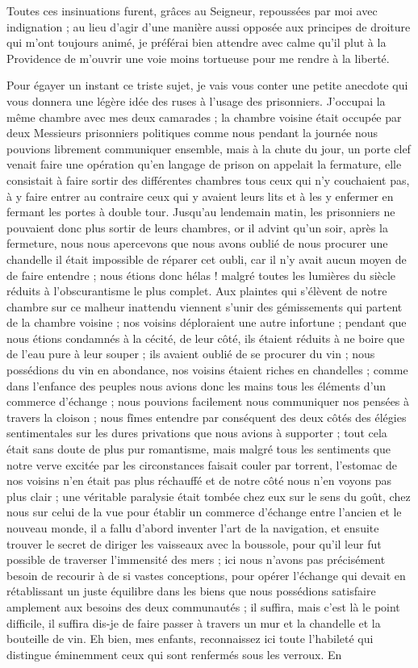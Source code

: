 \documentclass[11pt,a4paper]{report}
\begin{document}
Toutes ces insinuations furent, grâces au Seigneur, repoussées par moi avec indignation ; au lieu d'agir d'une manière aussi opposée aux principes de droiture qui m'ont toujours animé, je préférai bien attendre avec calme qu'il plut à la Providence de m'ouvrir une voie moins tortueuse pour me rendre à la liberté.

Pour égayer un instant ce triste sujet, je vais vous conter une petite anecdote qui vous donnera une légère idée des ruses à l'usage des prisonniers. J'occupai la même chambre avec mes deux camarades ; la chambre voisine était occupée par deux Messieurs prisonniers politiques comme nous pendant la journée nous pouvions librement communiquer ensemble, mais à la chute du jour, un porte clef venait faire une opération qu'en langage de prison on appelait la fermature, elle consistait à faire sortir des différentes chambres tous ceux qui n'y couchaient pas, à y faire entrer au contraire ceux qui y avaient leurs lits et à les y enfermer en fermant les portes à double tour. Jusqu'au lendemain matin, les prisonniers ne pouvaient donc plus sortir de leurs chambres, or il advint qu'un soir, après la fermeture, nous nous apercevons que nous avons oublié de nous procurer une chandelle il était impossible de réparer cet oubli, car il n'y avait aucun moyen de de faire entendre ; nous étions donc hélas ! malgré toutes les lumières du siècle réduits à l'obscurantisme le plus complet. Aux plaintes qui s'élèvent de notre chambre sur ce malheur inattendu viennent s'unir des gémissements qui partent de la chambre voisine ; nos voisins déploraient une autre infortune ; pendant que nous étions condamnés à la cécité, de leur côté, ils étaient réduits à ne boire que de l'eau pure à leur souper ; ils avaient oublié de se procurer du vin ; nous possédions du vin en abondance, nos voisins étaient riches en chandelles ; comme dans l'enfance des peuples nous avions donc les mains tous les éléments d'un commerce d'échange ; nous pouvions facilement nous communiquer nos pensées à travers la cloison ; nous fîmes entendre par conséquent des deux côtés des élégies sentimentales sur les dures privations que nous avions à supporter ; tout cela était sans doute de plus pur romantisme, mais malgré tous les sentiments que notre verve excitée par les circonstances faisait couler par torrent, l'estomac de nos voisins n'en était pas plus réchauffé et de notre côté nous n'en voyons pas plus clair ; une véritable paralysie était tombée chez eux sur le sens du goût, chez nous sur celui de la vue pour établir un commerce d'échange entre l'ancien et le nouveau monde, il a fallu d'abord inventer l'art de la navigation, et ensuite trouver le secret de diriger les vaisseaux avec la boussole, pour qu'il leur fut possible de traverser l'immensité des mers ; ici nous n'avons pas précisément besoin de recourir à de si vastes conceptions, pour opérer l'échange qui devait en rétablissant un juste équilibre dans les biens que nous possédions satisfaire amplement aux besoins des deux communautés ; il suffira, mais c'est là le point difficile, il suffira dis-je de faire passer à travers un mur et la chandelle et la bouteille de vin. Eh bien, mes enfants, reconnaissez ici toute l'habileté qui distingue éminemment ceux qui sont renfermés sous les verroux. En 
\end{document}
